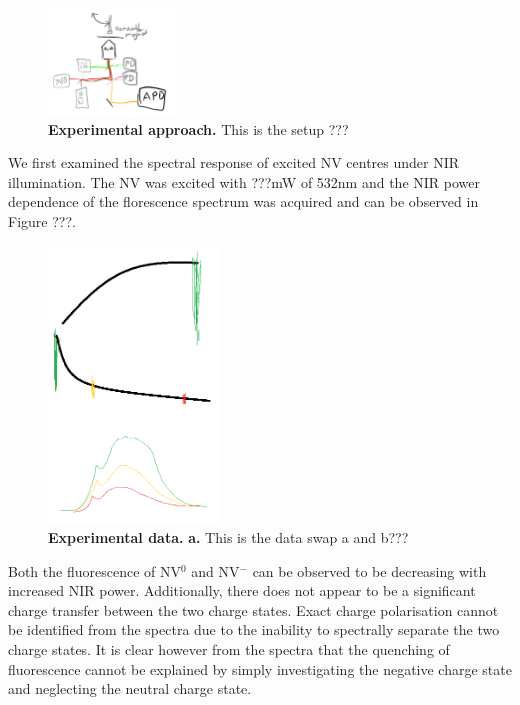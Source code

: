 \documentclass[prl]{revtex4}
\begin{document}
\begin{figure}[t]
  \centering
  \includegraphics[width=0.3\textwidth]{Setup.png} 
 \caption{\textbf{Experimental approach.} This is the setup ???} \label{FigSetup}
\end{figure}

We first examined the spectral response of excited NV centres under NIR illumination. The NV was excited with ???mW of 532nm and the NIR power dependence of the florescence spectrum was acquired and can be observed in Figure ???.

\begin{figure}[H]
  \centering
  \includegraphics[width=0.4\textwidth]{Spectra.png} 
 \caption{\textbf{Experimental data.} \textbf{a.} This is the data swap a and b???} \label{FigSpectra}
\end{figure}

Both the fluorescence of NV$^0$ and NV$^-$ can be observed to be decreasing with increased NIR power. Additionally, there does not appear to be a significant charge transfer between the two charge states. Exact charge polarisation cannot be identified from the spectra due to the inability to spectrally separate the two charge states. It is clear however from the spectra that the quenching of fluorescence cannot be explained by simply investigating the negative charge state and neglecting the neutral charge state.
\end{document}
